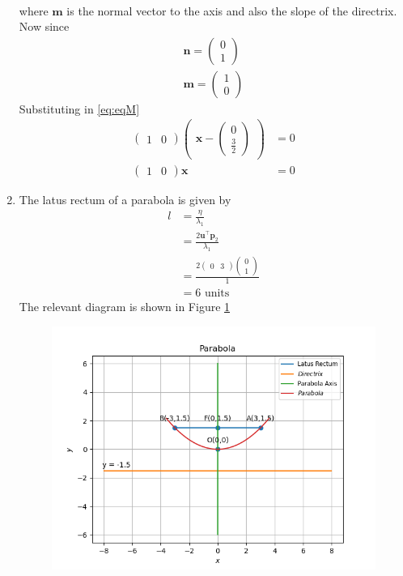 \documentclass[12pt]{article}
\newcommand{\myvec}[1]{\ensuremath{\begin{pmatrix}#1\end{pmatrix}}}
\let\vec\mathbf
\begin{document}
\begin{enumerate}
\begin{align}
\end{align}
where $\vec{m}$ is the normal vector to the axis and also the slope of the directrix. Now since
\begin{align}
	\vec{n} = \myvec{0\\1}\\
	\vec{m} = \myvec{1\\0}
\end{align}
Substituting in \eqref{eq:eqM}
\begin{align}
	\myvec{1&0}\myvec{\vec{x}-\myvec{0\\\frac{3}{2}}}&=0\\
	\myvec{1&0}\vec{x} &= 0
\end{align}
\item The latus rectum of a parabola is given by
\begin{align}
	l&=\frac{\eta}{\lambda_1}\\
	 &=\frac{2\vec{u}^\top \vec{p}_2}{\lambda_1}\\
	 &=\frac{2\myvec{0&3}\myvec{0\\1}}{1}\\
	 &=6 \text{ units }
\end{align}
The relevant diagram is shown in Figure \ref{fig:Fig1}
\begin{figure}[!h]
	\begin{center} 
	    \includegraphics[width=\columnwidth]{figs/parabola}
	\end{center}
\caption{}
\label{fig:Fig1}
\end{figure}

\end{enumerate}
\end{document}
